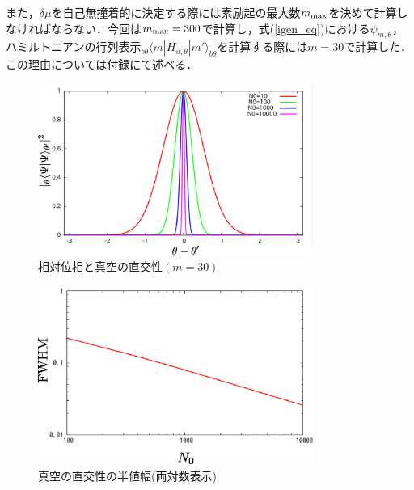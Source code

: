 \documentclass[10.5pt,a4paper]{jreport}
\begin{document}
また，$\delta \mu$を自己無撞着的に決定する際には素励起の最大数$m_{\rm max}$を決めて計算しなければならない．今回は$m_{\rm max}=300$で計算し，式(\ref{igen_eq})における$\psi_{m,\theta}$，ハミルトニアンの行列表示$_{b\theta}\langle m|H_{u,\theta}|m' \rangle_{b\theta}$を計算する際には$m=30$で計算した．この理由については付録にて述べる．
\begin{figure}[htbp]
  \centering
  \includegraphics[width = 9cm]{./EPS/fig1.eps}
  \caption{相対位相と真空の直交性$(m=30)$}
  \label{fig1}
\end{figure}

\begin{figure}[htbp]
  \centering
  \includegraphics[width = 9cm]{./EPS/fig5.eps}
  \caption{真空の直交性の半値幅(両対数表示)}
  \label{fig5}
\end{figure}
\end{document}
